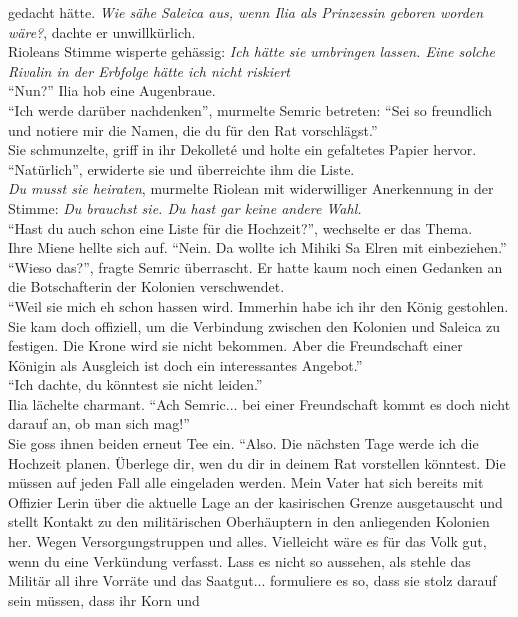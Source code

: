 gedacht hätte. \textit{Wie sähe Saleica aus, wenn Ilia als Prinzessin geboren worden wäre?}, dachte 
er unwillkürlich.\\
Rioleans Stimme wisperte gehässig: \textit{Ich hätte sie umbringen lassen. Eine solche Rivalin in 
der Erbfolge hätte ich nicht riskiert}\\
``Nun?'' Ilia hob eine Augenbraue.\\
``Ich werde darüber nachdenken'', murmelte Semric betreten: ``Sei so freundlich und notiere mir die 
Namen, die du für den Rat vorschlägst.''\\
Sie schmunzelte, griff in ihr Dekolleté und holte ein gefaltetes Papier hervor. ``Natürlich'', 
erwiderte sie und überreichte ihm die Liste.\\
\textit{Du musst sie heiraten}, murmelte Riolean mit widerwilliger Anerkennung in der Stimme: 
\textit{Du brauchst sie. Du hast gar keine andere Wahl.}\\
``Hast du auch schon eine Liste für die Hochzeit?'', wechselte er das Thema.\\
Ihre Miene hellte sich auf. ``Nein. Da wollte ich Mihiki Sa Elren mit einbeziehen.''\\
``Wieso das?'', fragte Semric überrascht. Er hatte kaum noch einen Gedanken an die Botschafterin 
der Kolonien verschwendet.\\
``Weil sie mich eh schon hassen wird. Immerhin habe ich ihr den König gestohlen. Sie kam doch 
offiziell, um die Verbindung zwischen den Kolonien und Saleica zu festigen. Die Krone wird sie 
nicht bekommen. Aber die Freundschaft einer Königin als Ausgleich ist doch ein interessantes 
Angebot.''\\
``Ich dachte, du könntest sie nicht leiden.''\\
Ilia lächelte charmant. ``Ach Semric... bei einer Freundschaft kommt es doch nicht darauf an, ob 
man sich mag!''\\
Sie goss ihnen beiden erneut Tee ein. ``Also. Die nächsten Tage werde ich die Hochzeit 
planen. Überlege dir, wen du dir in deinem Rat vorstellen könntest. Die müssen auf jeden Fall alle 
eingeladen werden. Mein Vater hat sich bereits mit Offizier Lerin über die aktuelle Lage an der 
kasirischen Grenze ausgetauscht und stellt Kontakt zu den militärischen Oberhäuptern in den 
anliegenden Kolonien her. Wegen Versorgungstruppen und alles. Vielleicht wäre es für das Volk gut, 
wenn du eine Verkündung verfasst. Lass es nicht so aussehen, als stehle das Militär all ihre 
Vorräte und das Saatgut... formuliere es so, dass sie stolz darauf sein müssen, dass ihr Korn und 
